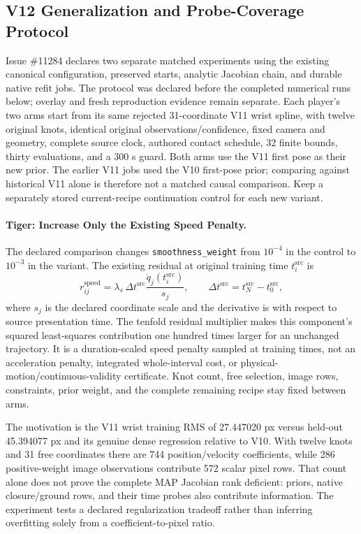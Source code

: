 \documentclass[11pt,letterpaper]{article}
\newcommand{\code}[1]{\nolinkurl{#1}}
\begin{document}
\subsection{V12 Generalization and Probe-Coverage Protocol}
\label{sec:v12-protocol}
Issue \#11284 declares two separate matched experiments using the existing
canonical configuration, preserved starts, analytic Jacobian chain, and durable
native refit jobs. The protocol was declared before the completed numerical
runs below; overlay and fresh reproduction evidence remain separate. Each
player's two arms start from its same rejected 31-coordinate V11 wrist spline,
with twelve original knots, identical original observations/confidence,
fixed camera and geometry, complete source clock, authored contact schedule,
32 finite bounds, thirty evaluations, and a 300 s guard. Both arms use the
V11 first pose as their new prior. The earlier V11 jobs used the V10 first-pose
prior; comparing against historical V11 alone is therefore not a matched
causal comparison. Keep a separately stored current-recipe continuation
control for each new variant.

\paragraph{Tiger: Increase Only the Existing Speed Penalty.}
The declared comparison changes \code{smoothness_weight} from $10^{-4}$ in
the control to $10^{-3}$ in the variant. The existing residual at original
training time $t_i^{\mathrm{src}}$ is
\begin{equation}
 r^{\mathrm{speed}}_{ij}
 =\lambda_s\,\Delta t^{\mathrm{src}}
 \frac{\dot q_j(t_i^{\mathrm{src}})}{s_j},
 \qquad
 \Delta t^{\mathrm{src}}=t_N^{\mathrm{src}}-t_0^{\mathrm{src}},
\end{equation}
where $s_j$ is the declared coordinate scale and the derivative is with respect
to source presentation time. The tenfold residual multiplier makes this
component's squared least-squares contribution one hundred times larger for
an unchanged trajectory. It is a duration-scaled speed penalty sampled at
training times, not an acceleration penalty, integrated whole-interval cost,
or physical-motion/continuous-validity certificate. Knot count, free selection,
image rows, constraints, prior weight, and the complete remaining recipe stay
fixed between arms.

The motivation is the V11 wrist training RMS of 27.447020 px versus held-out
45.394077 px and its genuine dense regression relative to V10. With twelve
knots and 31 free coordinates there are 744 position/velocity coefficients,
while 286 positive-weight image observations contribute 572 scalar pixel rows.
That count alone does not prove the complete MAP Jacobian rank deficient:
priors, native closure/ground rows, and their time probes also contribute
information. The experiment tests a declared regularization tradeoff rather
than inferring overfitting solely from a coefficient-to-pixel ratio.
\end{document}
